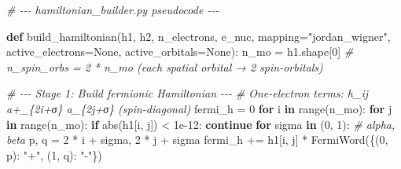 \documentclass[
  11pt,
]{report}
\newenvironment{Shaded}{}{}
\newcommand{\BuiltInTok}[1]{\textcolor[rgb]{0.00,0.50,0.00}{#1}}
\newcommand{\CommentTok}[1]{\textcolor[rgb]{0.38,0.63,0.69}{\textit{#1}}}
\newcommand{\ControlFlowTok}[1]{\textcolor[rgb]{0.00,0.44,0.13}{\textbf{#1}}}
\newcommand{\DecValTok}[1]{\textcolor[rgb]{0.25,0.63,0.44}{#1}}
\newcommand{\FloatTok}[1]{\textcolor[rgb]{0.25,0.63,0.44}{#1}}
\newcommand{\KeywordTok}[1]{\textcolor[rgb]{0.00,0.44,0.13}{\textbf{#1}}}
\newcommand{\NormalTok}[1]{#1}
\newcommand{\OperatorTok}[1]{\textcolor[rgb]{0.40,0.40,0.40}{#1}}
\newcommand{\StringTok}[1]{\textcolor[rgb]{0.25,0.44,0.63}{#1}}
\newcommand{\VariableTok}[1]{\textcolor[rgb]{0.10,0.09,0.49}{#1}}
\begin{document}
\begin{Shaded}
\begin{Highlighting}[]
\CommentTok{\# {-}{-}{-} hamiltonian\_builder.py pseudocode {-}{-}{-}}

\KeywordTok{def}\NormalTok{ build\_hamiltonian(h1, h2, n\_electrons, e\_nuc,}
\NormalTok{                      mapping}\OperatorTok{=}\StringTok{"jordan\_wigner"}\NormalTok{,}
\NormalTok{                      active\_electrons}\OperatorTok{=}\VariableTok{None}\NormalTok{, active\_orbitals}\OperatorTok{=}\VariableTok{None}\NormalTok{):}
\NormalTok{    n\_mo }\OperatorTok{=}\NormalTok{ h1.shape[}\DecValTok{0}\NormalTok{]}
    \CommentTok{\# n\_spin\_orbs = 2 * n\_mo  (each spatial orbital → 2 spin{-}orbitals)}

    \CommentTok{\# {-}{-}{-} Stage 1: Build fermionic Hamiltonian {-}{-}{-}}
    \CommentTok{\# One{-}electron terms: h\_ij a+\_\{2i+σ\} a\_\{2j+σ\}  (spin{-}diagonal)}
\NormalTok{    fermi\_h }\OperatorTok{=} \DecValTok{0}
    \ControlFlowTok{for}\NormalTok{ i }\KeywordTok{in} \BuiltInTok{range}\NormalTok{(n\_mo):}
        \ControlFlowTok{for}\NormalTok{ j }\KeywordTok{in} \BuiltInTok{range}\NormalTok{(n\_mo):}
            \ControlFlowTok{if} \BuiltInTok{abs}\NormalTok{(h1[i, j]) }\OperatorTok{\textless{}} \FloatTok{1e{-}12}\NormalTok{:}
                \ControlFlowTok{continue}
            \ControlFlowTok{for}\NormalTok{ sigma }\KeywordTok{in}\NormalTok{ (}\DecValTok{0}\NormalTok{, }\DecValTok{1}\NormalTok{):  }\CommentTok{\# alpha, beta}
\NormalTok{                p, q }\OperatorTok{=} \DecValTok{2} \OperatorTok{*}\NormalTok{ i }\OperatorTok{+}\NormalTok{ sigma, }\DecValTok{2} \OperatorTok{*}\NormalTok{ j }\OperatorTok{+}\NormalTok{ sigma}
\NormalTok{                fermi\_h }\OperatorTok{+=}\NormalTok{ h1[i, j] }\OperatorTok{*}\NormalTok{ FermiWord(\{(}\DecValTok{0}\NormalTok{, p): }\StringTok{"+"}\NormalTok{, (}\DecValTok{1}\NormalTok{, q): }\StringTok{"{-}"}\NormalTok{\})}


\end{Highlighting}
\end{Shaded}
\end{document}
